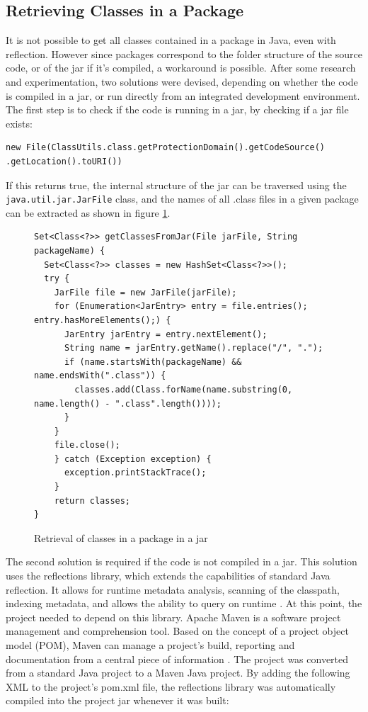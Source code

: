 \subsection{Retrieving Classes in a Package}
It is not possible to get all classes contained in a package in Java, even with reflection. However since packages correspond to the folder structure of the source code, or of the jar if it's compiled, a workaround is possible. After some research and experimentation, two solutions were devised, depending on whether the code is compiled in a jar, or run directly from an integrated development environment. The first step is to check if the code is running in a jar, by checking if a jar file exists:
\begin{verbatim}
new File(ClassUtils.class.getProtectionDomain().getCodeSource()
.getLocation().toURI())
\end{verbatim}
If this returns true, the internal structure of the jar can be traversed using the \\\texttt{java.util.jar.JarFile} class, and the names of all .class files in a given package can be extracted as shown in figure \ref{fig:classes_in_package_jar}.
\begin{figure}
\centering
\caption{Retrieval of classes in a package in a jar}
\label{fig:classes_in_package_jar}
\begin{verbatim}
Set<Class<?>> getClassesFromJar(File jarFile, String packageName) {
  Set<Class<?>> classes = new HashSet<Class<?>>();
  try {
    JarFile file = new JarFile(jarFile);
    for (Enumeration<JarEntry> entry = file.entries(); 
entry.hasMoreElements();) {
      JarEntry jarEntry = entry.nextElement();
      String name = jarEntry.getName().replace("/", ".");
      if (name.startsWith(packageName) && name.endsWith(".class")) {
        classes.add(Class.forName(name.substring(0, name.length() - ".class".length())));
      }
    }
    file.close();
    } catch (Exception exception) {
      exception.printStackTrace();
    }
    return classes;
}
\end{verbatim}
\end{figure}
The second solution is required if the code is not compiled in a jar. This solution uses the reflections library, which extends the capabilities of standard Java reflection. It allows for runtime metadata analysis, scanning of the classpath, indexing metadata, and allows the ability to query on runtime \cite{reflections}.
At this point, the project needed to depend on this library. Apache Maven is a software project management and comprehension tool. Based on the concept of a project object model (POM), Maven can manage a project's build, reporting and documentation from a central piece of information \cite{maven}. The project was converted from a standard Java project to a Maven Java project. By adding the following XML to the project’s pom.xml file, the reflections library was automatically compiled into the project jar whenever it was built:
